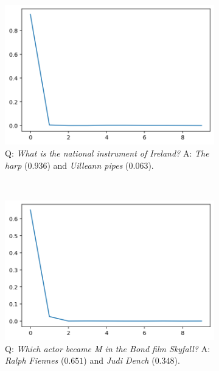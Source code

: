 \documentclass[a4paper]{article}
\theoremstyle{plain}
\theoremstyle{definition}
\theoremstyle{plain}
\begin{document}
\begin{figure}[t]
\begin{center}
    \begin{subfigure}[t]{0.23\linewidth}
      \includegraphics[width=\textwidth]{prob_harp.png}
    \caption*{\tiny Q: \emph{What is the national instrument of Ireland?} A: \emph{The harp} ($0.936$) and \emph{Uilleann pipes} ($0.063$).}
  \end{subfigure}
  ~~
  \begin{subfigure}[t]{0.23\linewidth}
    \includegraphics[width=\textwidth]{prob_actor.png}
    \caption*{\tiny Q: \emph{Which actor became M in the Bond film Skyfall?} A: \emph{Ralph Fiennes} ($0.651$) and \emph{Judi Dench} ($0.348$).}
  \end{subfigure}
  ~~
  \begin{subfigure}[t]{0.23\linewidth}

\end{subfigure}
\end{center}
\end{figure}
\end{document}
